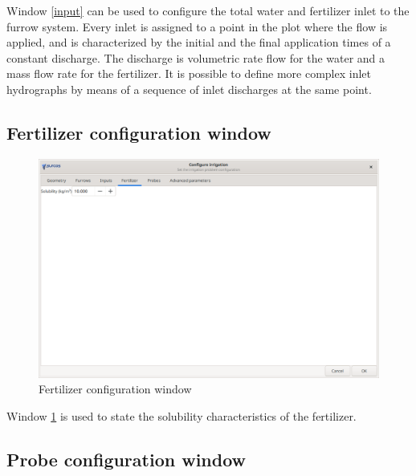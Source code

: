 Window \ref{input} can be used to configure the total water and fertilizer inlet to the furrow system. Every inlet is assigned to a point in the plot where the flow is applied, and is characterized by the initial and the final application times of a constant discharge. The discharge is volumetric rate flow for the water and a mass flow rate for the fertilizer. It is possible to define more complex inlet hydrographs by means of a sequence of inlet discharges at the same point. 

\subsection{Fertilizer configuration window}

\begin{figure}[!h]
\begin{center}
\includegraphics*[width=\textwidth]{images/confFertiEN.png}
\qquad
\caption{Fertilizer configuration window}\label{ferti}
\end{center}
\end{figure}

Window \ref{ferti} is used to state the solubility characteristics of the fertilizer. 

\subsection{Probe configuration window}

